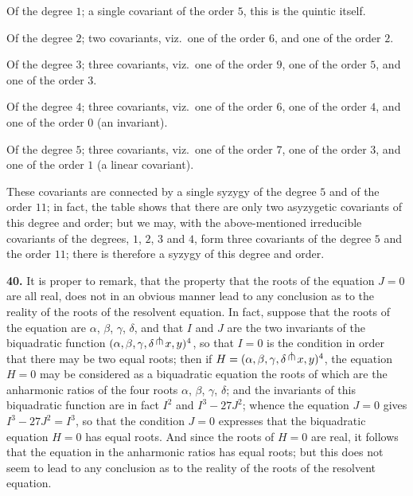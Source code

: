 \documentclass[11pt,a4paper]{book}
\begin{document}
Of the degree $1$; a single covariant of the order $5$, this is the quintic itself.

Of the degree $2$; two covariants, viz.\ one of the order $6$, and one of the order $2$.

Of the degree $3$; three covariants, viz.\ one of the order $9$, one of the order $5$, and one of the order $3$.

Of the degree $4$; three covariants, viz.\ one of the order $6$, one of the order $4$, and one of the order $0$ (an invariant).

Of the degree $5$; three covariants, viz.\ one of the order $7$, one of the order $3$, and one of the order $1$ (a linear covariant).

These covariants are connected by a single syzygy of the degree $5$ and of the order $11$; in fact, the table shows that there are only two asyzygetic covariants of this degree and order; but we may, with the above-mentioned irreducible covariants of the degrees, $1$, $2$, $3$ and $4$, form three covariants of the degree $5$ and the order $11$; there is therefore a syzygy of this degree and order.

\clearpage
\setcounter{page}{265}

\textbf{40.} It is proper to remark, that the property that the roots of the equation $J=0$ are all real, does not in an obvious manner lead to any conclusion as to the reality of the roots of the resolvent equation. In fact, suppose that the roots of the equation are $\alpha$, $\beta$, $\gamma$, $\delta$, and that $I$ and $J$ are the two invariants of the biquadratic function $(\alpha,\beta,\gamma,\delta\,\raisebox{0.5ex}{$\pitchfork$}\, x, y)^{4}$, so that $I=0$ is the condition in order that there may be two equal roots; then if $H=(\alpha,\beta,\gamma,\delta\,\raisebox{0.5ex}{$\pitchfork$}\, x, y)^{4}$, the equation $H=0$ may be considered as a biquadratic equation the roots of which are the anharmonic ratios of the four roots $\alpha$, $\beta$, $\gamma$, $\delta$; and the invariants of this biquadratic function are in fact $I^{2}$ and $I^{3}-27J^{2}$; whence the equation $J=0$ gives $I^{3}-27J^{2}=I^{3}$, so that the condition $J=0$ expresses that the biquadratic equation $H=0$ has equal roots. And since the roots of $H=0$ are real, it follows that the equation in the anharmonic ratios has equal roots; but this does not seem to lead to any conclusion as to the reality of the roots of the resolvent equation.
\end{document}
